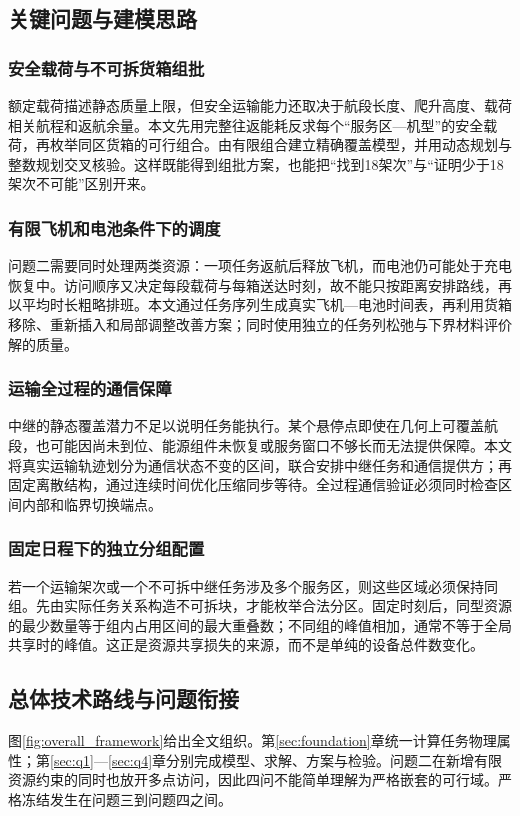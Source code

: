 \subsection{关键问题与建模思路}
\subsubsection{安全载荷与不可拆货箱组批}
额定载荷描述静态质量上限，但安全运输能力还取决于航段长度、爬升高度、载荷相关航程和返航余量。本文先用完整往返能耗反求每个“服务区—机型”的安全载荷，再枚举同区货箱的可行组合。由有限组合建立精确覆盖模型，并用动态规划与整数规划交叉核验。这样既能得到组批方案，也能把“找到18架次”与“证明少于18架次不可能”区别开来。

\subsubsection{有限飞机和电池条件下的调度}
问题二需要同时处理两类资源：一项任务返航后释放飞机，而电池仍可能处于充电恢复中。访问顺序又决定每段载荷与每箱送达时刻，故不能只按距离安排路线，再以平均时长粗略排班。本文通过任务序列生成真实飞机—电池时间表，再利用货箱移除、重新插入和局部调整改善方案；同时使用独立的任务列松弛与下界材料评价解的质量。

\subsubsection{运输全过程的通信保障}
中继的静态覆盖潜力不足以说明任务能执行。某个悬停点即使在几何上可覆盖航段，也可能因尚未到位、能源组件未恢复或服务窗口不够长而无法提供保障。本文将真实运输轨迹划分为通信状态不变的区间，联合安排中继任务和通信提供方；再固定离散结构，通过连续时间优化压缩同步等待。全过程通信验证必须同时检查区间内部和临界切换端点。

\subsubsection{固定日程下的独立分组配置}
若一个运输架次或一个不可拆中继任务涉及多个服务区，则这些区域必须保持同组。先由实际任务关系构造不可拆块，才能枚举合法分区。固定时刻后，同型资源的最少数量等于组内占用区间的最大重叠数；不同组的峰值相加，通常不等于全局共享时的峰值。这正是资源共享损失的来源，而不是单纯的设备总件数变化。



\subsection{总体技术路线与问题衔接}
\label{sec:overall_route}
图\ref{fig:overall_framework}给出全文组织。第\ref{sec:foundation}章统一计算任务物理属性；第\ref{sec:q1}—\ref{sec:q4}章分别完成模型、求解、方案与检验。问题二在新增有限资源约束的同时也放开多点访问，因此四问不能简单理解为严格嵌套的可行域。严格冻结发生在问题三到问题四之间。

